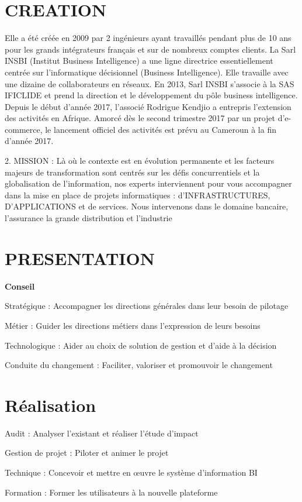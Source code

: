 \section{CREATION} 
Elle a été créée en 2009 par 2 ingénieurs ayant travaillés pendant plus de 10 ans pour les grands intégrateurs français et sur de nombreux comptes clients. La Sarl INSBI (Institut Business Intelligence) a une ligne directrice essentiellement centrée sur l’informatique décisionnel (Business Intelligence). Elle travaille avec une dizaine de collaborateurs en réseaux. 
En 2013, Sarl INSBI s’associe à la SAS IFICLIDE et prend la direction et le développement du pôle business intelligence. Depuis le début d’année 2017, l’associé Rodrigue Kendjio a entrepris l’extension des activités en Afrique. Amorcé dès le second trimestre 2017 par un projet d’e-commerce, le lancement officiel des activités est prévu au Cameroun à la fin d’année 2017.

2.	MISSION :
Là où le contexte est en évolution permanente et les facteurs majeurs de transformation sont centrés sur les défis concurrentiels et la globalisation de l’information, nos experts interviennent pour vous accompagner dans la mise en place de projets informatiques : d’INFRASTRUCTURES, D’APPLICATIONS et de services.
Nous intervenons dans le domaine bancaire, l’assurance la grande distribution et l’industrie

\section{PRESENTATION}
\textbf{Conseil}
	\begin{list}{•}{ }
	 \item Stratégique : Accompagner les directions générales dans leur besoin de pilotage
	\item Métier : Guider les directions métiers dans l’expression de leurs besoins
	\item Technologique : Aider au choix de solution de gestion et d’aide à la décision
	\item Conduite du changement : Faciliter, valoriser et promouvoir le changement
	\end{list}
\section{Réalisation}
\begin{list}{•}{ }
   \item Audit : Analyser l’existant et réaliser l’étude d’impact
	\item Gestion de projet : Piloter et animer le projet
	\item Technique : Concevoir et mettre en œuvre le système d’information BI
   \item Formation : Former les utilisateurs à la nouvelle plateforme
\end{list}

